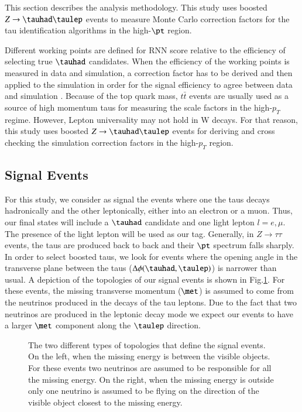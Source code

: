 This section describes the analysis methodology. This study uses boosted $Z\to\tauhad\taulep$ events to measure Monte Carlo correction factors for the tau identification algorithms in the high-$\pt$ region.

Different working points are defined for RNN score relative to the efficiency of selecting true $\tauhad$ candidates. When the efficiency of the working points is measured in data and simulation, a correction factor has to be derived and then applied to the simulation in order for the signal efficiency to agree between data and simulation \cite{ATLAS:2017mpa}. Because of the top quark mass, $t\bar{t}$ events are usually used as a source of high momentum taus for measuring the scale factors in the high-$p_T$ regime. However, Lepton universality may not hold in W decays. For that reason, this study uses boosted $Z\to\tauhad\taulep$ events for deriving and cross checking the simulation correction factors in the high-$p_T$ region.   
\subsection{Signal Events}\label{signalevents}
For this study, we consider as signal the events where one the taus decays hadronically and the other leptonically, either into an electron or a muon. Thus, our final states will include a $\tauhad$ candidate and one light lepton $l=e,\mu$. The presence of the light lepton will be used as our tag. 
Generally, in $Z\to\tau\tau$ events, the taus are produced back to back and their $\pt$ spectrum falls sharply. In order to select boosted taus, we look for events where the opening angle in the transverse plane between the taus ($\Delta\phi(\tauhad,\taulep)$) is narrower than usual. A depiction of the topologies of our signal events is shown in Fig.\ref{Fig1}. For these events, the missing transverse momentum ($\met$) is assumed to come from the neutrinos produced in the decays of the tau leptons. Due to the fact that two neutrinos are produced in the leptonic decay mode we expect our events to have a larger $\met$ component along the $\taulep$ direction.
\begin{figure}[htbp]
	\centering
	\hfill
	\caption{The two different types of topologies that define the signal events. On the left, when the missing energy is between the visible objects. For these events two neutrinos are assumed to be responsible for all the missing energy. On the right, when the missing energy is outside only one neutrino is assumed to be flying on the direction of the visible object closest to the missing energy.}
	\label{Fig1}
\end{figure}

